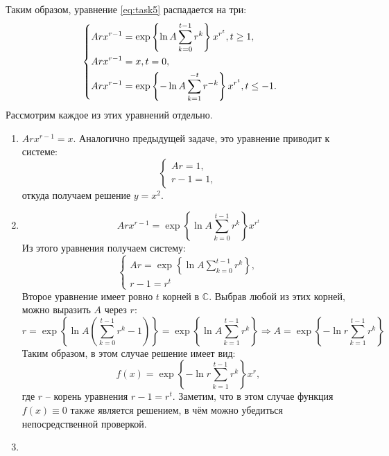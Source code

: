 \documentclass[11pt]{article}
\newcounter{th}\setcounter{th}{0}
\begin{document}
Таким образом, уравнение \eqref{eq:task5} распадается на три:
\begin{equation*}
\begin{dcases}
Arx^{r - 1} = \exp\left\{\ln A\sum_{k = 0}^{t - 1}r^k\right\}x^{r^t}, t \geq 1, \\
Arx^{r - 1} = x, t = 0, \\
Arx^{r - 1} = \exp\left\{-\ln A\sum_{k = 1}^{-t}r^{-k}\right\}x^{r^t}, t \leq -1.
\end{dcases}
\end{equation*}
Рассмотрим каждое из этих уравнений отдельно.
\begin{enumerate}
\item $Arx^{r - 1} = x$. Аналогично предыдущей задаче, это уравнение приводит к системе:
\begin{equation*}
\begin{cases}
Ar = 1, \\
r - 1 = 1,
\end{cases}
\end{equation*}
откуда получаем решение $y = x^2$.
\item \begin{equation*}
Arx^{r - 1} = \exp\left\{\ln A\sum_{k = 0}^{t - 1}r^k\right\}x^{r^t}
\end{equation*}
Из этого уравнения получаем систему:
\begin{equation*}
\begin{cases}
Ar = \exp\left\{\ln A\sum_{k = 0}^{t - 1}r^k\right\}, \\
r - 1 = r^t
\end{cases}
\end{equation*}
Второе уравнение имеет ровно $t$ корней в $\mathbb{C}$. Выбрав любой из этих корней, можно выразить $A$ через $r$:
\begin{equation*}
r = \exp\left\{\ln A\left(\sum_{k = 0}^{t - 1}r^k - 1\right)\right\} = \exp\left\{\ln A\sum_{k = 1}^{t - 1}r^k\right\} \Rightarrow A = \exp\left\{-\ln r\sum_{k = 1}^{t - 1}r^k\right\}
\end{equation*}
Таким образом, в этом случае решение имеет вид:
\begin{equation*}
f(x) = \exp\left\{-\ln r\sum_{k = 1}^{t - 1}r^k\right\}x^r,
\end{equation*}
где $r$ -- корень уравнения $r - 1 = r^t$. Заметим, что в этом случае функция $f(x) \equiv 0$ также является решением, в чём можно убедиться непосредственной проверкой.
\item \begin{equation*}

\end{equation*}
\end{enumerate}
\end{document}
